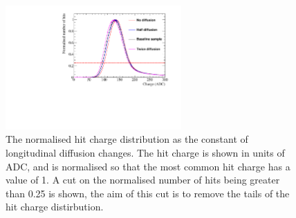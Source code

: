 \begin{figure}[h!]
  \centering
  \includegraphics[width=0.6\textwidth]{Canvas_ChargeCut_Diffusion}
  \caption[The normalised hit charge distribution as the constant of longitudinal diffusion changes]
          {The normalised hit charge distribution as the constant of longitudinal diffusion changes. The hit charge is shown in units of ADC, and is normalised so that the most common hit charge has a value of 1. A cut on the normalised number of hits being greater than 0.25 is shown, the aim of this cut is to remove the tails of the hit charge distirbution.}
  \label{fig:DiffNoiseStudy_ChargeCut}
\end{figure}
